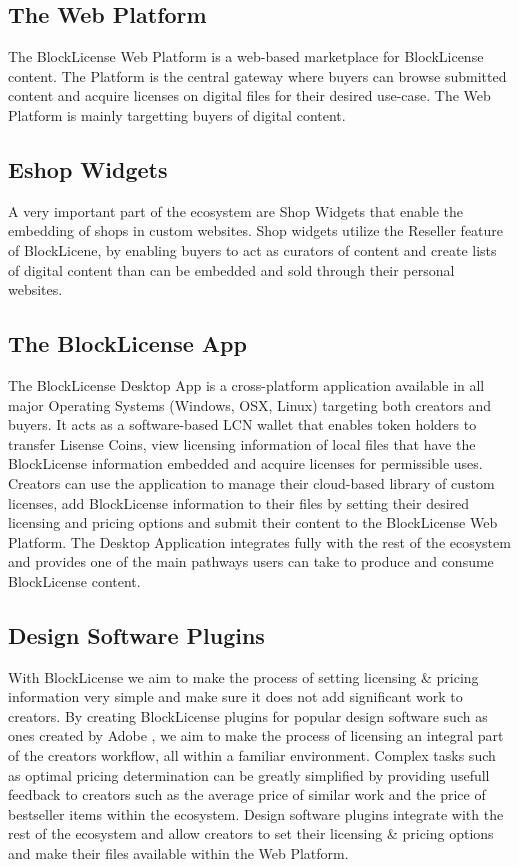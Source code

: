\subsection{The Web Platform}

The BlockLicense Web Platform is a web-based marketplace for BlockLicense content. The Platform is the central gateway where buyers can browse submitted content and acquire licenses on digital files for their desired use-case. The Web Platform is mainly targetting buyers of digital content.

\subsection{Eshop Widgets}
A very important part of the ecosystem are Shop Widgets that enable the embedding of shops in custom websites. Shop widgets utilize the Reseller feature of BlockLicene, by enabling buyers to act as curators of content and create lists of digital content than can be embedded and sold through their personal websites.

\subsection{The BlockLicense App}

The BlockLicense Desktop App is a cross-platform application available in all major Operating Systems (Windows, OSX, Linux) targeting both creators and buyers. It acts as a software-based LCN wallet that enables token holders to transfer Lisense Coins, view licensing information of local files that have the BlockLicense information embedded and acquire licenses for permissible uses. Creators can use the application to manage their cloud-based library of custom licenses, add BlockLicense information to their files by setting their desired licensing and pricing options and submit their content to the BlockLicense Web Platform. The Desktop Application integrates fully with the rest of the ecosystem and provides one of the main pathways users can take to produce and consume BlockLicense content.

\subsection{Design Software Plugins}

With BlockLicense we aim to make the process of setting licensing \& pricing information very simple and make sure it does not add significant work to creators. By creating BlockLicense plugins for popular design software such as ones created by Adobe \cite{adobe}, we aim to make the process of licensing an integral part of the creators workflow, all within a familiar environment. Complex tasks such as optimal pricing determination can be greatly simplified by providing usefull feedback to creators such as the average price of similar work and the price of bestseller items within the ecosystem. Design software plugins integrate with the rest of the ecosystem and allow creators to set their licensing \& pricing options and make their files available within the Web Platform.



